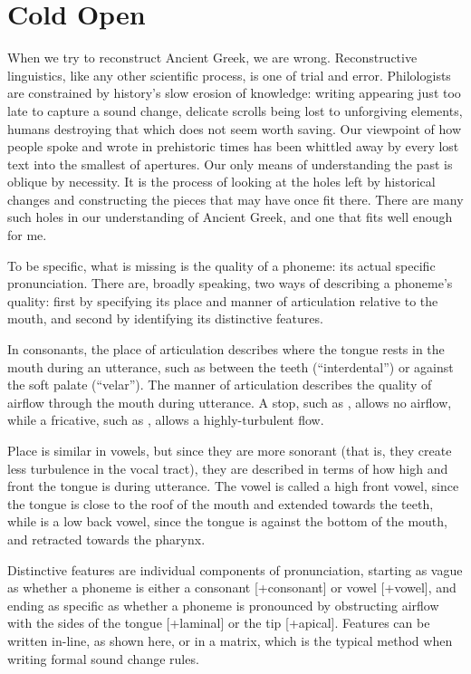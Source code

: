 \clearpage
\section{Cold Open}\label{sec:ColdOpen}

When we try to reconstruct Ancient Greek, we are wrong.  Reconstructive linguistics, like any other scientific process, is one of trial and error.  Philologists are constrained by history's slow erosion of knowledge: writing appearing just too late to capture a sound change, delicate scrolls being lost to unforgiving elements, humans destroying that which does not seem worth saving.  Our viewpoint of how people spoke and wrote in prehistoric times has been whittled away by every lost text into the smallest of apertures.  Our only means of understanding the past is oblique by necessity.  It is the process of looking at the holes left by historical changes and constructing the pieces that may have once fit there.  There are many such holes in our understanding of Ancient Greek, and one that fits well enough for me.

To be specific, what is missing is the quality of a phoneme: its actual specific pronunciation. There are, broadly speaking, two ways of describing a phoneme's quality: first by specifying its place and manner of articulation relative to the mouth, and second by identifying its distinctive features.

In consonants, the place of articulation describes where the tongue rests in the mouth during an utterance, such as between the teeth (``interdental'') or against the soft palate (``velar''). The manner of articulation describes the quality of airflow through the mouth during utterance. A stop, such as , allows no airflow, while a fricative, such as , allows a highly-turbulent flow.

Place is similar in vowels, but since they are more sonorant (that is, they create less turbulence in the vocal tract), they are described in terms of how high and front the tongue is during utterance. The vowel  is called a high front vowel, since the tongue is close to the roof of the mouth and extended towards the teeth, while  is a low back vowel, since the tongue is against the bottom of the mouth, and retracted towards the pharynx.




Distinctive features are individual components of pronunciation, starting as vague as whether a phoneme is either a consonant [+consonant] or vowel [+vowel], and ending as specific as whether a phoneme is pronounced by obstructing airflow with the sides of the tongue [+laminal] or the tip [+apical]. Features can be written in-line, as shown here, or in a matrix, which is the typical method when writing formal sound change rules.
